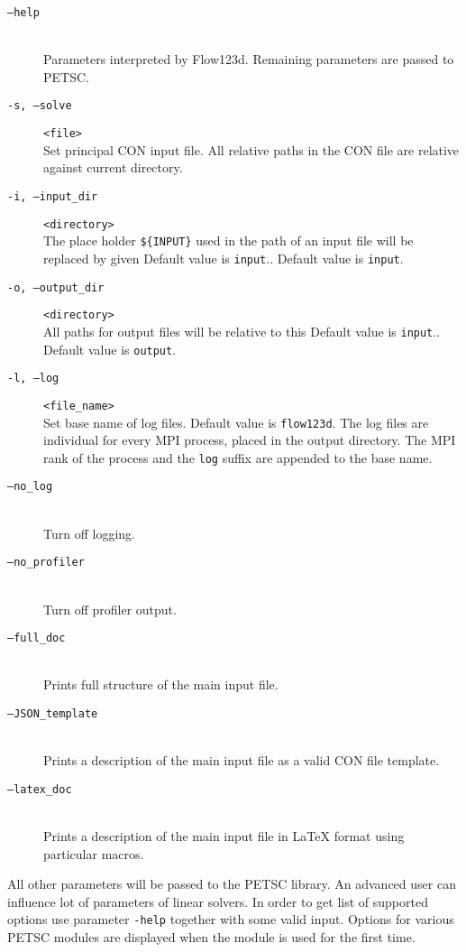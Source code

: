 \documentclass[12pt,a4paper]{report}
\begin{document}
\begin{description}
 \item[{\tt --help}] \hfill\\
        Parameters interpreted by Flow123d. Remaining parameters are passed to PETSC.
 \item[ {\tt -s, --solve} ] \verb'<file>' \hfill\\
 	 Set principal CON input file. All relative paths in the CON file are relative against current directory.
 \item[{\tt -i, --input\_dir}] \verb'<directory>' \hfill\\
 	The place holder \verb"${INPUT}" %
  	used in the path of an input file will be replaced by given Default value is \verb'input'.. Default value is \verb'input'.
 \item[{\tt -o, --output\_dir}] \verb'<directory>' \hfill\\
 	All paths for output files will be relative to this Default value is \verb'input'.. Default value is \verb'output'.
 \item[{\tt -l, --log}] \verb'<file_name>' \hfill\\
 	Set base name of log files. Default value is \verb'flow123d'. The log files are individual for every MPI process, placed in the output directory. 
 	The MPI rank of the process and the \verb'log' suffix are appended to the base name.
 \item[{\tt --no\_log}] \hfill\\
        Turn off logging.
 \item[{\tt --no\_profiler}] \hfill\\
        Turn off profiler output.
 \item[{\tt --full\_doc}] \hfill\\
        Prints full structure of the main input file.
 \item[{\tt --JSON\_template}] \hfill\\
        Prints a description of the main input file as a valid CON file template.
 \item[{\tt --latex\_doc}] \hfill\\ 
        Prints a description of the main input file in LaTeX format using particular macros.
\end{description}
All other parameters will be passed to the PETSC library. An advanced user can influence lot of parameters of linear solvers. In order to get list of supported options 
use parameter \verb'-help' together with some valid input. Options for various PETSC modules are displayed when the module is used for the first time.
\end{document}
